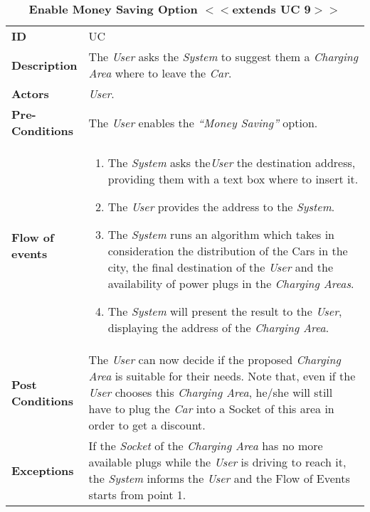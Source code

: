 \begin{longtable}{|p{0.2\linewidth} | p{0.8\linewidth}|}
	\captionsetup{labelformat=empty} %
	\caption{\textbf{Enable Money Saving Option $<<$extends UC 9$>>$}} %
	\label{UC_MoneySavingOption}%
	\\ \hline %
	
	\textbf{ID} & UC\theUseCaseIdCounter \\ \hline
	\textbf{Description} & The \emph{User} asks the \emph{System} to suggest them a \emph{Charging Area} where to leave the \emph{Car}. \\ \hline
	\textbf{Actors} & \emph{User}.\\ \hline
	\textbf{Pre-Conditions} & The \emph{User} enables the \textit{\textquotedblleft{Money Saving}\textquotedblright} option. \\ \hline
	\textbf{Flow of events} & 
	\begin{enumerate}
		\item The \emph{System} asks the\emph{User} the destination address, providing them with a text box where to insert it.
		\item The \emph{User} provides the address to the \emph{System}.
		\item The \emph{System} runs an algorithm which takes in consideration the distribution of the Cars in the city, the final destination of the \emph{User} and the availability of power plugs in the \emph{Charging Areas}.
		\item The \emph{System} will present the result to the \emph{User}, displaying the address of the \emph{Charging Area}.
	\end{enumerate}	 \\ \hline
	\textbf{Post Conditions} & The \emph{User} can now decide if the proposed \emph{Charging Area} is suitable for their needs. Note that, even if the \emph{User} chooses this \emph{Charging Area}, he/she will still have to plug the \emph{Car} into a Socket of this area in order to get a discount.
	\\ \hline
	\textbf{Exceptions} & If the \emph{Socket} of the \emph{Charging Area} has no more available plugs while the \emph{User} is driving to reach it, the \emph{System} informs the \emph{User} and the Flow of Events starts from point 1.\\ \hline
\end{longtable}
